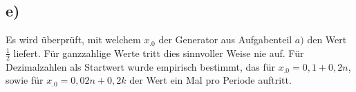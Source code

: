 \subsection*{e)}
Es wird überprüft, mit welchem $x_.0$ der Generator aus Aufgabenteil $a)$
den Wert $\frac{1}{2}$ liefert. Für ganzzahlige Werte tritt dies sinnvoller Weise nie auf. Für Dezimalzahlen als Startwert wurde empirisch bestimmt, das für $x_.0 = 0,1 + 0,2n$, sowie für $x_.0 = 0,02n + 0,2k$ der Wert ein Mal pro Periode auftritt.